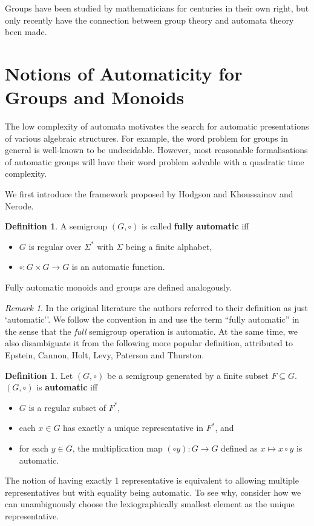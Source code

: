 \documentclass[british,a4paper,]{scrartcl}
\theoremstyle{definition}
\newtheorem{definition}[theorem]{Definition}
\theoremstyle{remark}
\newtheorem*{remark}{Remark}
\begin{document}
Groups have been studied by mathematicians for centuries in their own right,
but only recently have the connection between group theory and automata theory been made.\autocite{Ho76,Ho83,KN,Epstein}

\section{Notions of Automaticity for Groups and Monoids}

The low complexity of automata motivates the search for automatic presentations of various algebraic structures.
For example,
the word problem for groups in general is well-known to be undecidable.
However, most reasonable formalisations of automatic groups will have their word problem solvable with a
quadratic time complexity.\autocite{Epstein,KKM}

We first introduce the framework proposed by Hodgson\autocite{Ho76, Ho83} and
Khoussainov and Nerode\autocite{KN}.
\begin{definition} \label{defn:fullyauto}
     A semigroup \((G,\circ)\) is called \textbf{fully automatic} iff
     \begin{itemize}
         \item \(G\) is regular over \(\Sigma^*\) with \(\Sigma\) being a finite alphabet,
         \item \(\circ: G\times G \to G\) is an automatic function.
     \end{itemize}
     Fully automatic monoids and groups are defined analogously.
\end{definition}
\begin{remark}
    In the original literature the authors referred to their definition as just `automatic''.
    We follow the convention in \autocite{fullautomatatheory} and use the term ``fully automatic''
    in the sense that the \emph{full} semigroup operation is automatic.
    At the same time, we also disambiguate it from the following more popular definition,
    attributed to Epstein, Cannon, Holt, Levy, Paterson and Thurston\autocite{Epstein}.
\end{remark}

\begin{definition} \label{defn:epsteinauto}
    Let \((G, \circ)\) be a semigroup generated by a finite subset \(F \subseteq G\).
    \((G, \circ)\) is \textbf{automatic} iff
    \begin{itemize}
        \item \(G\) is a regular subset of \(F^*\),
        \item each \(x\in G\) has exactly a unique representative in \(F^*\), and
        \item for each \(y \in G\), the multiplication map \((\circ y) : G \to G\) defined
            as \(x \mapsto x\circ y\) is automatic.
    \end{itemize}
    The notion of having exactly 1 representative is equivalent to allowing multiple representatives but
    with equality being automatic.
    To see why, consider how we can unambiguously choose the
    lexiographically smallest element as the unique representative.
\end{definition}
\end{document}
